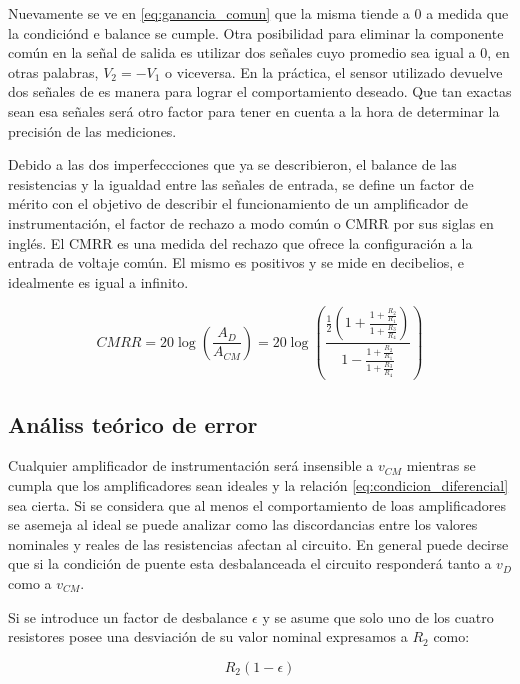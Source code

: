 \documentclass[a4paper]{article}
\begin{document}
Nuevamente se ve en \ref{eq:ganancia_comun} que la misma tiende a 0 a medida que la condiciónd e balance se cumple. Otra posibilidad para eliminar la componente común en la señal de salida es utilizar dos señales cuyo promedio sea igual a 0, en otras palabras, $V_2 = - V_1$ o viceversa. En la práctica, el sensor utilizado devuelve dos señales de es manera para lograr el comportamiento deseado. Que tan exactas sean esa señales será otro factor para tener en cuenta a la hora de determinar la precisión de las mediciones. 


Debido a las dos imperfeccciones que ya se describieron, el balance de las resistencias y la igualdad entre las señales de entrada, se define un factor de mérito con el objetivo de describir el funcionamiento de un amplificador de instrumentación, el factor de rechazo a modo común o CMRR por sus siglas en inglés. El CMRR es una medida del rechazo que ofrece la configuración a la entrada de  voltaje común. El mismo es positivos y se mide en decibelios, e idealmente es igual a infinito.

\begin{equation}\label{eq:CMRR}
CMRR   =   20\log(\frac{A_D}{A_{CM}})   = 20\log(\frac{\frac{1}{2}(1 + \frac{1 + \frac{R_2}{R_1}}{1 + \frac{R_3}{R_4}})}{1 - \frac{1 + \frac{R_2}{R_1}}{1 + \frac{R_3}{R_4}}})
\end{equation}

\subsection{Análiss teórico de error}
Cualquier amplificador de instrumentación será insensible a $v_{CM}$ mientras se cumpla que los amplificadores sean ideales y la relación \ref{eq:condicion_diferencial} sea cierta. Si se considera que al menos el comportamiento de loas amplificadores se asemeja al ideal se puede analizar como las discordancias entre los valores nominales y reales de las resistencias afectan al circuito. En general puede decirse que si la condición de puente esta desbalanceada el circuito responderá tanto a $v_D$ como a $v_{CM}$.

Si se introduce un factor de desbalance $\epsilon$ y se asume que solo uno de los cuatro resistores posee una desviación de su valor nominal expresamos a $R_2$ como:

\begin{equation}\label{R_2_epsilon}
R_2(1 - \epsilon)
\end{equation} 
\end{document}

